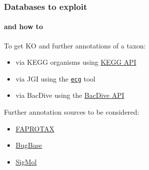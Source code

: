\documentclass{beamer}
\begin{document}
\begin{frame}
\begin{singlespace}
\begin{textblock*}{10cm}


         \end{textblock*}




      \end{singlespace}

   \end{frame}

   \begin{frame}
      \frametitle{Databases to exploit}
      \framesubtitle{and how to}

      To get KO and further annotations of a taxon: 
      \begin{itemize}
         \item via KEGG organisms using \href{https://www.kegg.jp/kegg/rest/keggapi.html}{KEGG API}
         \item via JGI using the \href{https://github.com/ELIFE-ASU/ecg}{\texttt{ecg}} tool
         \item via BacDive using the \href{https://api.bacdive.dsmz.de/}{BacDive API} \\ 
      \end{itemize}

      Further annotation sources to be considered: 
      \begin{itemize}
         \item \href{https://pages.uoregon.edu/slouca/LoucaLab/archive/FAPROTAX/lib/php/index.php}{FAPROTAX}
         \item \href{https://bugbase.cs.umn.edu/}{BugBase}
         \item \href{https://bioinfo.imtech.res.in/manojk/sigmol/}{SigMol}
      \end{itemize}

   \end{frame}
\end{document}
